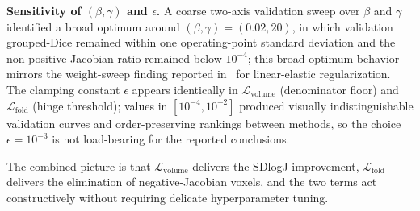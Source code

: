 \documentclass[jimaging,article,submit,pdftex,moreauthors]{Definitions/mdpi}
\begin{document}
\noindent\textbf{Sensitivity of $(\beta,\gamma)$ and $\epsilon$.} A coarse two-axis validation sweep over $\beta$ and $\gamma$ identified a broad optimum around $(\beta,\gamma)=(0.02,20)$, in which validation grouped-Dice remained within one operating-point standard deviation and the non-positive Jacobian ratio remained below $10^{-4}$; this broad-optimum behavior mirrors the weight-sweep finding reported in~\cite{elasticmorph2025} for linear-elastic regularization. The clamping constant $\epsilon$ appears identically in $\mathcal{L}_{\mathrm{volume}}$ (denominator floor) and $\mathcal{L}_{\mathrm{fold}}$ (hinge threshold); values in $[10^{-4},10^{-2}]$ produced visually indistinguishable validation curves and order-preserving rankings between methods, so the choice $\epsilon=10^{-3}$ is not load-bearing for the reported conclusions.

The combined picture is that $\mathcal{L}_{\mathrm{volume}}$ delivers the SDlogJ improvement, $\mathcal{L}_{\mathrm{fold}}$ delivers the elimination of negative-Jacobian voxels, and the two terms act constructively without requiring delicate hyperparameter tuning.
\end{document}
